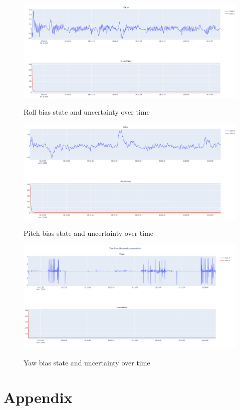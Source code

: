 \documentclass[12pt]{article}
\begin{document}
\begin{figure}[H]
    \centering
    \includegraphics[width=\linewidth]{figures/rb_uncertainty.png}\\
    \caption{Roll bias state and uncertainty over time}
    \label{fig:rb}
\end{figure}
\begin{figure}[H]
    \centering
    \includegraphics[width=\linewidth]{figures/pb_uncertainty.png}\\
    \caption{Pitch bias state and uncertainty over time}
    \label{fig:pb}
\end{figure}
\begin{figure}[H]
    \centering
    \includegraphics[width=\linewidth]{figures/yb_uncertainty.png}\\
    \caption{Yaw bias state and uncertainty over time}
    \label{fig:yb}
\end{figure}


\newpage
\section{Appendix}

\end{document}
